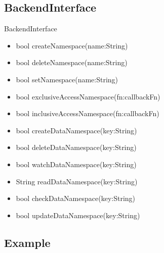 \documentclass{beamer}
\begin{document}
\subsection {BackendInterface}
\begin{frame}
\begin{block}{BackendInterface}
		\begin{itemize}
			\item bool \alert{createNamespace}(name:String)
			\item bool \alert{deleteNamespace}(name:String)
			\item bool \alert{setNamespace}(name:String)
			\item bool \alert{exclusiveAccessNamespace}(fn:callbackFn)
			\item bool \alert{inclusiveAccessNamespace}(fn:callbackFn)
			\item bool \alert{createDataNamespace}(key:String)
			\item bool \alert{deleteDataNamespace}(key:String)
			\item bool \alert{watchDataNamespace}(key:String)
			\item String \alert{readDataNamespace}(key:String)
			\item bool \alert{checkDataNamespace}(key:String)
			\item bool \alert{updateDataNamespace}(key:String)
		\end{itemize}
	\end{block}

\end{frame}





\subsection {Example}
\end{document}
